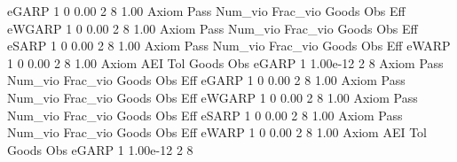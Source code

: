        eGARP {\VBAR}    1           0        0.00           2           8        1.00  
{\smallskip}
{\smallskip}
{\smallskip}
       Axiom {\VBAR} Pass     Num_vio    Frac_vio       Goods         Obs         Eff  
      eWGARP {\VBAR}    1           0        0.00           2           8        1.00  
{\smallskip}
{\smallskip}
{\smallskip}
       Axiom {\VBAR} Pass     Num_vio    Frac_vio       Goods         Obs         Eff  
       eSARP {\VBAR}    1           0        0.00           2           8        1.00  
{\smallskip}
{\smallskip}
{\smallskip}
       Axiom {\VBAR} Pass     Num_vio    Frac_vio       Goods         Obs         Eff  
       eWARP {\VBAR}    1           0        0.00           2           8        1.00  
{\smallskip}
       Axiom {\VBAR}       AEI        Tol      Goods        Obs 
       eGARP {\VBAR}         1   1.00e-12          2          8 
{\smallskip}
{\smallskip}
{\smallskip}
       Axiom {\VBAR} Pass     Num_vio    Frac_vio       Goods         Obs         Eff  
       eGARP {\VBAR}    1           0        0.00           2           8        1.00  
{\smallskip}
{\smallskip}
{\smallskip}
       Axiom {\VBAR} Pass     Num_vio    Frac_vio       Goods         Obs         Eff  
      eWGARP {\VBAR}    1           0        0.00           2           8        1.00  
{\smallskip}
{\smallskip}
{\smallskip}
       Axiom {\VBAR} Pass     Num_vio    Frac_vio       Goods         Obs         Eff  
       eSARP {\VBAR}    1           0        0.00           2           8        1.00  
{\smallskip}
{\smallskip}
{\smallskip}
       Axiom {\VBAR} Pass     Num_vio    Frac_vio       Goods         Obs         Eff  
       eWARP {\VBAR}    1           0        0.00           2           8        1.00  
{\smallskip}
       Axiom {\VBAR}       AEI        Tol      Goods        Obs 
       eGARP {\VBAR}         1   1.00e-12          2          8 
{\smallskip}
{\smallskip}
